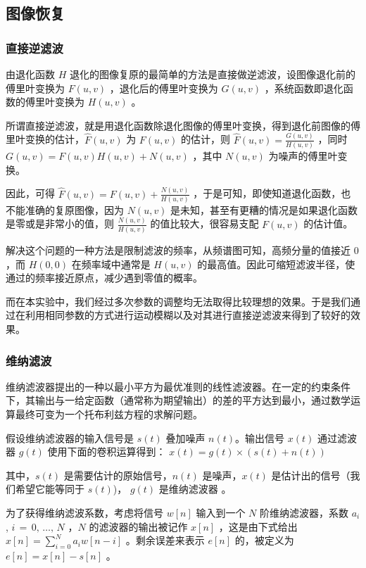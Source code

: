 \documentclass[11pt]{ctexart}
\begin{document}
\subsection{图像恢复}

\subsubsection{直接逆滤波}

由退化函数 $H$ 退化的图像复原的最简单的方法是直接做逆滤波，设图像退化前的傅里叶变换为 $F(u,v)$ ，退化后的傅里叶变换为 $G(u,v)$ ，系统函数即退化函数的傅里叶变换为 $H(u,v)$ 。

所谓直接逆滤波，就是用退化函数除退化图像的傅里叶变换，得到退化前图像的傅里叶变换的估计，$\hat{F}(u,v)$ 为 $F(u,v)$ 的估计，则 $\hat{F}(u,v)=\frac{G(u,v)}{H(u,v)}$ ，同时 $G(u,v)=F(u,v)H(u,v)+N(u,v)$ ，其中 $N(u,v)$ 为噪声的傅里叶变换。

因此，可得 $\hat{F}(u,v)=F(u,v)+\frac{N(u,v)}{H(u,v)}$ ，于是可知，即使知道退化函数，也不能准确的复原图像，因为 $N(u,v)$ 是未知，甚至有更糟的情况是如果退化函数是零或是非常小的值，则 $\frac{N(u,v)}{H(u,v)}$ 的值比较大，很容易支配 $F(u,v)$ 的估计值。

解决这个问题的一种方法是限制滤波的频率，从频谱图可知，高频分量的值接近 $0$ ，而 $H(0,0)$ 在频率域中通常是 $H(u,v)$ 的最高值。因此可缩短滤波半径，使通过的频率接近原点，减少遇到零值的概率。

而在本实验中，我们经过多次参数的调整均无法取得比较理想的效果。于是我们通过在利用相同参数的方式进行运动模糊以及对其进行直接逆滤波来得到了较好的效果。

\subsubsection{维纳滤波}

维纳滤波器提出的一种以最小平方为最优准则的线性滤波器。在一定的约束条件下，其输出与一给定函数（通常称为期望输出）的差的平方达到最小，通过数学运算最终可变为一个托布利兹方程的求解问题。

假设维纳滤波器的输入信号是 $s(t)$ 叠加噪声 $n(t)$。输出信号 $x(t)$ 通过滤波器 $g(t)$ 使用下面的卷积运算得到： $ x(t)=g(t)\times (s(t)+n(t))$

其中，$s(t)$ 是需要估计的原始信号，$n(t)$ 是噪声，$x(t)$ 是估计出的信号（我们希望它能等同于 $ s(t)$)， $g(t)$ 是维纳滤波器 。

为了获得维纳滤波系数，考虑将信号 $w[n]$ 输入到一个 $N$ 阶维纳滤波器，系数 $a_{i}$ , $i\,=\,0,\,\ldots ,\,N$ ，$N$ 的滤波器的输出被记作 $x[n]$ ，这是由下式给出 $ x[n]=\sum _{i=0}^{N}a_{i}w[n-i]$ 。剩余误差来表示 $e[n]$ 的，被定义为 $e[n] = x[n] − s[n]$ 。
\end{document}
